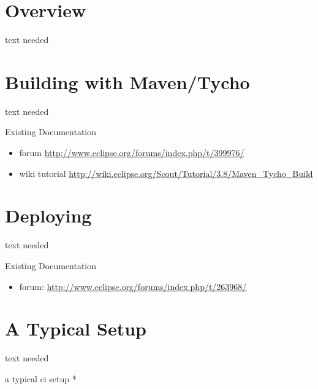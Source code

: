 \documentclass[a4paper,10pt,twoside]{book}
\begin{document}
\section{Overview}
text needed

\section{Building with Maven/Tycho}
text needed
 
\noindent Existing Documentation
\begin{itemize}
  \item forum \url{http://www.eclipse.org/forums/index.php/t/399976/}
  \item wiki tutorial \url{http://wiki.eclipse.org/Scout/Tutorial/3.8/Maven_Tycho_Build}
\end{itemize}

\section{Deploying}
text needed
 
\noindent Existing Documentation
\begin{itemize}
  \item forum: \url{http://www.eclipse.org/forums/index.php/t/263968/}
\end{itemize}

\section{A Typical Setup}
text needed

  a typical ci setup
  * 


\ifx\wholebook\relax\else
   
   
\end{document}
